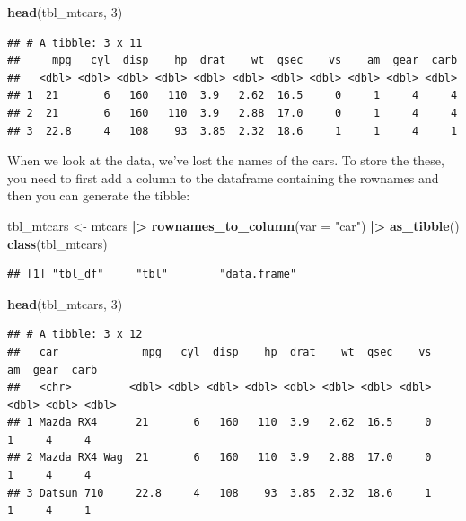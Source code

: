 \documentclass[
  12pt,
  oneside]{book}
\newenvironment{Shaded}{\begin{snugshade}}{\end{snugshade}}
\newcommand{\AttributeTok}[1]{\textcolor[rgb]{0.13,0.29,0.53}{#1}}
\newcommand{\DecValTok}[1]{\textcolor[rgb]{0.00,0.00,0.81}{#1}}
\newcommand{\FunctionTok}[1]{\textcolor[rgb]{0.13,0.29,0.53}{\textbf{#1}}}
\newcommand{\NormalTok}[1]{#1}
\newcommand{\OtherTok}[1]{\textcolor[rgb]{0.56,0.35,0.01}{#1}}
\newcommand{\SpecialCharTok}[1]{\textcolor[rgb]{0.81,0.36,0.00}{\textbf{#1}}}
\newcommand{\StringTok}[1]{\textcolor[rgb]{0.31,0.60,0.02}{#1}}
\theoremstyle{definition}
\theoremstyle{definition}
\theoremstyle{definition}
\theoremstyle{definition}
\theoremstyle{remark}
\begin{document}
\begin{Shaded}
\begin{Highlighting}[]
\FunctionTok{head}\NormalTok{(tbl\_mtcars, }\DecValTok{3}\NormalTok{)}
\end{Highlighting}
\end{Shaded}

\begin{verbatim}
## # A tibble: 3 x 11
##     mpg   cyl  disp    hp  drat    wt  qsec    vs    am  gear  carb
##   <dbl> <dbl> <dbl> <dbl> <dbl> <dbl> <dbl> <dbl> <dbl> <dbl> <dbl>
## 1  21       6   160   110  3.9   2.62  16.5     0     1     4     4
## 2  21       6   160   110  3.9   2.88  17.0     0     1     4     4
## 3  22.8     4   108    93  3.85  2.32  18.6     1     1     4     1
\end{verbatim}

When we look at the data, we've lost the names of the cars. To store the these, you need to first add a column to the dataframe containing the rownames and then you can generate the tibble:

\begin{Shaded}
\begin{Highlighting}[]
\NormalTok{tbl\_mtcars }\OtherTok{\textless{}{-}}\NormalTok{ mtcars }\SpecialCharTok{|\textgreater{}} 
  \FunctionTok{rownames\_to\_column}\NormalTok{(}\AttributeTok{var =} \StringTok{"car"}\NormalTok{) }\SpecialCharTok{|\textgreater{}}
  \FunctionTok{as\_tibble}\NormalTok{() }
\FunctionTok{class}\NormalTok{(tbl\_mtcars)}
\end{Highlighting}
\end{Shaded}

\begin{verbatim}
## [1] "tbl_df"     "tbl"        "data.frame"
\end{verbatim}

\begin{Shaded}
\begin{Highlighting}[]
\FunctionTok{head}\NormalTok{(tbl\_mtcars, }\DecValTok{3}\NormalTok{)}
\end{Highlighting}
\end{Shaded}

\begin{verbatim}
## # A tibble: 3 x 12
##   car             mpg   cyl  disp    hp  drat    wt  qsec    vs    am  gear  carb
##   <chr>         <dbl> <dbl> <dbl> <dbl> <dbl> <dbl> <dbl> <dbl> <dbl> <dbl> <dbl>
## 1 Mazda RX4      21       6   160   110  3.9   2.62  16.5     0     1     4     4
## 2 Mazda RX4 Wag  21       6   160   110  3.9   2.88  17.0     0     1     4     4
## 3 Datsun 710     22.8     4   108    93  3.85  2.32  18.6     1     1     4     1
\end{verbatim}
\end{document}
